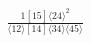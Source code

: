 \documentclass[varwidth, border=5pt]{standalone}
\begin{document}
\begin{my}
$\begin{gathered}
\scriptscriptstyle\frac{1[15]⟨24⟩^2}{⟨12⟩[14]⟨34⟩⟨45⟩}
\end{gathered}$
\end{my}
\end{document}
